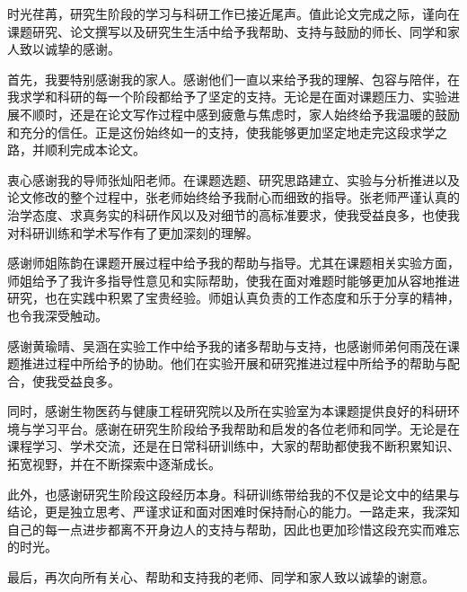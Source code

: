 
\begin{acknowledgements}
  时光荏苒，研究生阶段的学习与科研工作已接近尾声。值此论文完成之际，谨向在课题研究、论文撰写以及研究生生活中给予我帮助、支持与鼓励的师长、同学和家人致以诚挚的感谢。

  首先，我要特别感谢我的家人。感谢他们一直以来给予我的理解、包容与陪伴，在我求学和科研的每一个阶段都给予了坚定的支持。无论是在面对课题压力、实验进展不顺时，还是在论文写作过程中感到疲惫与焦虑时，家人始终给予我温暖的鼓励和充分的信任。正是这份始终如一的支持，使我能够更加坚定地走完这段求学之路，并顺利完成本论文。

  衷心感谢我的导师张灿阳老师。在课题选题、研究思路建立、实验与分析推进以及论文修改的整个过程中，张老师始终给予我耐心而细致的指导。张老师严谨认真的治学态度、求真务实的科研作风以及对细节的高标准要求，使我受益良多，也使我对科研训练和学术写作有了更加深刻的理解。
  
  感谢师姐陈韵在课题开展过程中给予我的帮助与指导。尤其在课题相关实验方面，师姐给予了我许多指导性意见和实际帮助，使我在面对难题时能够更加从容地推进研究，也在实践中积累了宝贵经验。师姐认真负责的工作态度和乐于分享的精神，也令我深受触动。

  感谢黄瑜晴、吴涵在实验工作中给予我的诸多帮助与支持，也感谢师弟何雨茂在课题推进过程中所给予的协助。他们在实验开展和研究推进过程中所给予的帮助与配合，使我受益良多。

  同时，感谢生物医药与健康工程研究院以及所在实验室为本课题提供良好的科研环境与学习平台。感谢在研究生阶段给予我帮助和启发的各位老师和同学。无论是在课程学习、学术交流，还是在日常科研训练中，大家的帮助都使我不断积累知识、拓宽视野，并在不断探索中逐渐成长。

  此外，也感谢研究生阶段这段经历本身。科研训练带给我的不仅是论文中的结果与结论，更是独立思考、严谨求证和面对困难时保持耐心的能力。一路走来，我深知自己的每一点进步都离不开身边人的支持与帮助，因此也更加珍惜这段充实而难忘的时光。

  最后，再次向所有关心、帮助和支持我的老师、同学和家人致以诚挚的谢意。
\end{acknowledgements}

